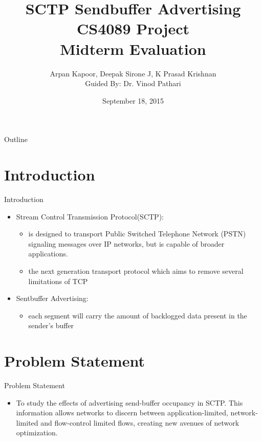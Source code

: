 \documentclass{beamer}
\title{SCTP Sendbuffer Advertising\\ {\normalsize CS4089 Project\\Midterm Evaluation}}
\author{Arpan Kapoor, Deepak Sirone J, K Prasad Krishnan\\Guided By: Dr. Vinod Pathari}
\date{September 18, 2015}
\begin{document}
\begin{frame}
  \titlepage
\end{frame}

\begin{frame}{Outline}
  \tableofcontents
\end{frame}
\section{Introduction}
\begin{frame}{Introduction}
\begin{itemize}
 \item Stream Control Transmission Protocol(SCTP):
\begin{itemize}
 \item is designed to transport Public Switched Telephone Network (PSTN) signaling messages
   over IP networks, but is capable of broader applications.
\end{itemize}
\begin{itemize}
 \item the next generation transport protocol which aims to remove several limitations of TCP
\end{itemize}
\end{itemize}
\begin{itemize}
 \item Sentbuffer Advertising:
\begin{itemize}
 \item each segment will carry the amount of backlogged data present in the sender's
   buffer   
\end{itemize}
\end{itemize}

\end{frame}

\section{Problem Statement}
\begin{frame}{Problem Statement}
\begin{itemize}
 \item To study the effects of advertising send-buffer occupancy in SCTP. 
This information allows networks to discern between application-limited, network-limited and flow-control limited flows, creating new avenues of network optimization.
\end{itemize}
\end{frame}
\end{document}
